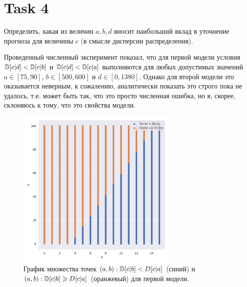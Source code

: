 \section{Task 4}

\begin{task}
    Определить, какая из величин $a, b, d$ вносит наибольший вклад в уточнение прогноза для величины c (в смысле дисперсии распределения).
\end{task}


Проведенный численный эксперимент показал, что для первой модели условия $\mathbb{D} [c|d] < \mathbb{D} [c|b]$ и $\mathbb{D} [c|d] < \mathbb{D} [c|a]$ выполняются для любых допустимых значений $a \in [75, 90]$, $b \in [500, 600]$ и $d \in [0, 1380]$. Однако для второй модели это оказывается неверным, к сожалению, аналитически показать это строго пока не удалось, т.е. может быть так, что это просто численная ошибка, но я, скорее, склоняюсь к тому, что это свойства модели.

\begin{figure}[H]
    \centering
    \includegraphics[width=0.7\textwidth]{pics/task4_1.pdf}
    \caption{График множества точек ${(a, b): \mathbb{D} [c|b] < D[c|a]}$ (синий) и ${(a, b): \mathbb{D} [c|b] \geqslant D[c|a]}$ (оранжевый) для первой модели.}
\end{figure}

